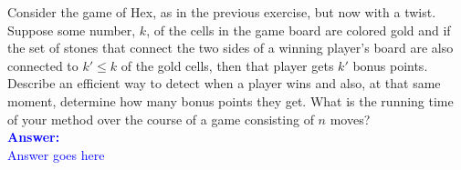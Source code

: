 \item{}
Consider the game of Hex, as in the previous exercise, but now with a twist.
Suppose some number, $k$, of the cells in the game board are colored gold and if
the set of stones that connect the two sides of a winning player's board are
also connected to $k'\le k$ of the gold cells, then that player gets $k'$ bonus
points. Describe an efficient way to detect when a player wins and also, at that
same moment, determine how many bonus points they get. What is the running time
of your method over the course of a game consisting of $n$ moves?\\[12pt]
\ifanswers
\textcolor{blue}{
\textbf{Answer:}\\[6pt]
Answer goes here
}
\newpage
\fi
